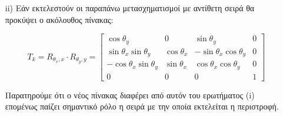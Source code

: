 \begin{solution}
\begin{enumerate}
	    \item[ii)]  Εάν εκτελεστούν οι παραπάνω μετασχηματισμοί με αντίθετη σειρά θα προκύψει ο ακόλουθος πίνακας:

\[
T_k = R_{\theta_x, x} \cdot R_{\theta_y, y} = 
	\begin{bmatrix}
	\cos \theta_y & 0 & \sin \theta_y & 0 \\
	\sin \theta_x \sin \theta_y & \cos \theta_x & -\sin \theta_x \cos \theta_y & 0 \\
	-\cos \theta_x \sin \theta_y & \sin \theta_x & \cos \theta_x \cos \theta_y & 0 \\
	0 & 0 & 0 & 1
	\end{bmatrix}
\]	

Παρατηρούμε ότι ο νέος πίνακας διαφέρει από αυτόν του ερωτήματος (i) επομένως παίζει σημαντικό ρόλο η σειρά με την οποία εκτελείται η περιστροφή.

\end{enumerate}

\end{solution}